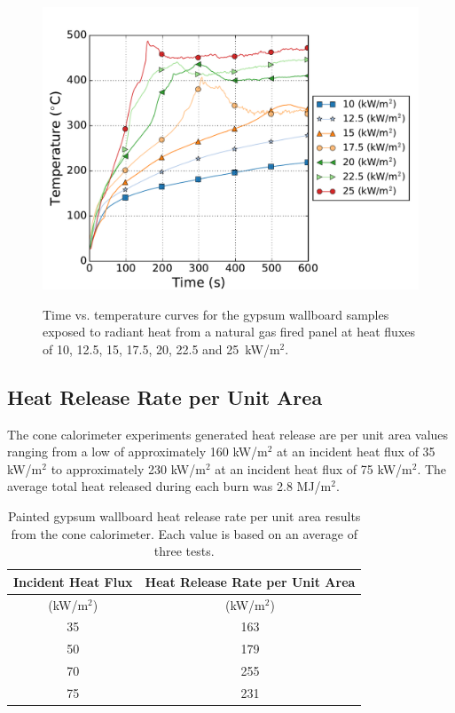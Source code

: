 \documentclass[twoside]{uocthesis}
\begin{document}
\begin{figure}[p]
	\centering
	\includegraphics[width=\textwidth]{../Figures/RP_GB_Front} \\
	\caption[Time vs. temperature curves for the gypsum wallboard samples exposed to radiant heat from a natural gas fired panel]{Time vs. temperature curves for the gypsum wallboard samples exposed to radiant heat from a natural gas fired panel at heat fluxes of 10, 12.5, 15, 17.5, 20, 22.5 and 25~kW/m$^2$.}
	\label{RP_GB_Front}
\end{figure}



\subsection{Heat Release Rate per Unit Area}

The cone calorimeter experiments generated heat release are per unit area values ranging from a low of approximately 160 kW/m$^2$ at an incident heat flux of 35 kW/m$^2$ to approximately 230 kW/m$^2$ at an incident heat flux of 75 kW/m$^2$.  The average total heat released during each burn was 2.8 MJ/m$^2$.    

\begin{table}
	\centering
	\begin{tabular}{|c|c|}
		\hline Incident Heat Flux & Heat Release Rate per Unit Area    \\
		\hline (kW/m$^2$) & (kW/m$^2$)  \\ \hline
		\hline 35 	& 163 	\\
		\hline 50	& 179   \\
		\hline 70	& 255  	\\
		\hline 75	& 231 	\\
		\hline
	\end{tabular}
	\caption[Painted gypsum wallboard time heat release rate per unit area results]{Painted gypsum wallboard heat release rate per unit area results from the cone calorimeter. Each value is based on an average of three tests.}
	\label{tab:Gypsum wallboard_HRRA}
\end{table}
\end{document}

